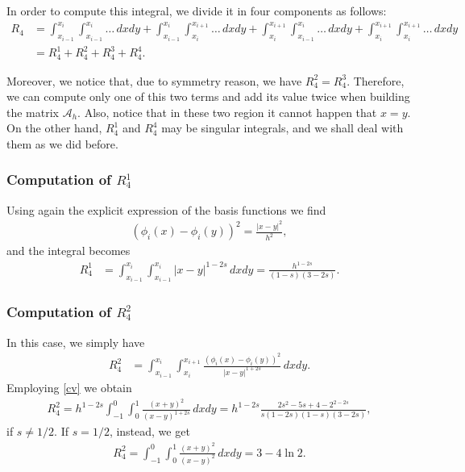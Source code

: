 {In order to compute this integral, we divide it in four components as follows:
\begin{align*}
	R_4 &= \int_{x_{i-1}}^{x_i}\int_{x_{i-1}}^{x_i} \ldots\,dxdy + \int_{x_{i-1}}^{x_i}\int_{x_i}^{x_{i+1}} \ldots\,dxdy +
	\int_{x_i}^{x_{i+1}}\int_{x_{i-1}}^{x_i} \ldots\,dxdy +  \int_{x_i}^{x_{i+1}}\int_{x_i}^{x_{i+1}} \ldots\,dxdy
	\\
	&= R_4^1 + R_4^2 + R_4^3 + R_4^4.
\end{align*}

Moreover, we notice that, due to symmetry reason, we have $R_4^2 = R_4^3$. Therefore, we can compute only one of this two terms and add its value twice when building the matrix $\mathcal A_h$. Also, notice that in these two region it cannot happen that $x=y$. On the other hand, $R_4^1$ and $R_4^4$ may be singular integrals, and we shall deal with them as we did before. 

\subsubsection*{Computation of $R_4^1$}
Using again the explicit expression of the basis functions we find 
\begin{align*}
	(\phi_i(x)-\phi_i(y))^2 = \frac{|x-y|^2}{h^2},
\end{align*}
and the integral becomes
\begin{align*}
	R_4^1 &= \int_{x_{i-1}}^{x_i}\int_{x_{i-1}}^{x_i} |x-y|^{1-2s}\,dxdy = \frac{h^{1-2s}}{(1-s)(3-2s)}. 
\end{align*}

\subsubsection*{Computation of $R_4^2$}
In this case, we simply have
\begin{align*}
	R_4^2 &= \int_{x_{i-1}}^{x_i}\int_{x_i}^{x_{i+1}} \frac{(\phi_i(x)-\phi_i(y))^2}{|x-y|^{1+2s}}\,dxdy.
\end{align*}
Employing \eqref{cv} we obtain
\begin{align*}
	R_4^2 = h^{1-2s}\int_{-1}^0\int_0^1 \frac{(x+y)^2}{(x-y)^{1+2s}}\,dxdy = h^{1-2s}\frac{2s^2-5s+4-2^{2-2s}}{s(1-2s)(1-s)(3-2s)}, 
\end{align*}
if $s\neq 1/2$. If $s=1/2$, instead, we get
\begin{align*}
	R_4^2 = \int_{-1}^0\int_0^1 \frac{(x+y)^2}{(x-y)^2}\,dxdy = 3-4\ln 2.
\end{align*}
}
